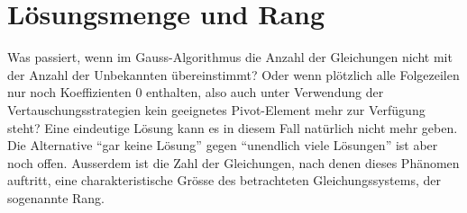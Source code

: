 %
%
%
\section{Lösungsmenge und Rang\label{section:loesungsmenge}}
Was passiert, wenn im Gauss-Algorithmus die Anzahl der Gleichungen
nicht mit der Anzahl der Unbekannten übereinstimmt? Oder wenn
plötzlich alle Folgezeilen nur noch Koeffizienten $0$ enthalten,
also auch unter Verwendung der Vertauschungsstrategien kein geeignetes
Pivot-Element mehr zur Verfügung steht? Eine eindeutige Lösung kann
es in diesem Fall natürlich nicht mehr geben.
Die Alternative ``gar keine Lösung'' gegen ``unendlich viele Lösungen''
ist aber noch offen.
Ausserdem ist die Zahl der Gleichungen, nach denen dieses Phänomen
auftritt, eine charakteristische Grösse des betrachteten Gleichungssystems,
der sogenannte Rang.

